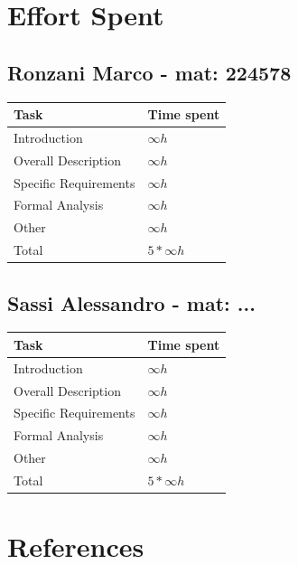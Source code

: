 \documentclass[11pt]{article}
\begin{document}
\newpage

\section{Effort Spent}
\label{section:effort}

\subsection{Ronzani Marco - mat: 224578}

\begin{tabular}{|l|l|}
    \hline
    \textbf{Task} & \textbf{Time spent} \\
    \hline
    Introduction & $\infty h$ \\
    \hline
    Overall Description & $\infty h$ \\
    \hline
    Specific Requirements & $\infty h$ \\
    \hline
    Formal Analysis & $\infty h$ \\
    \hline
    Other & $\infty h$ \\
    \hline
    \hline
    Total & $5*\infty h$ \\
    \hline
\end{tabular}

\subsection{Sassi Alessandro - mat: ...}

\begin{tabular}{|l|l|}
    \hline
    \textbf{Task} & \textbf{Time spent} \\
    \hline
    Introduction & $\infty h$ \\
    \hline
    Overall Description & $\infty h$ \\
    \hline
    Specific Requirements & $\infty h$ \\
    \hline
    Formal Analysis & $\infty h$ \\
    \hline
    Other & $\infty h$ \\
    \hline
    \hline
    Total & $5*\infty h$ \\
    \hline
\end{tabular}

\section{References}
\label{section:references}
\end{document}
